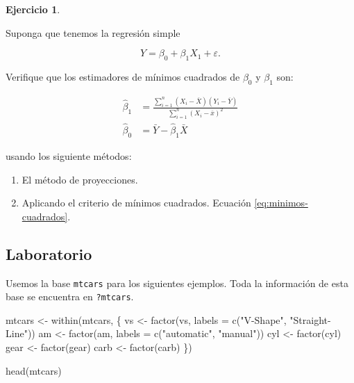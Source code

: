\documentclass[
  12pt,
]{book}
\newenvironment{Shaded}{\begin{snugshade}}{\end{snugshade}}
\newcommand{\AttributeTok}[1]{\textcolor[rgb]{0.77,0.63,0.00}{#1}}
\newcommand{\FunctionTok}[1]{\textcolor[rgb]{0.00,0.00,0.00}{#1}}
\newcommand{\NormalTok}[1]{#1}
\newcommand{\OtherTok}[1]{\textcolor[rgb]{0.56,0.35,0.01}{#1}}
\newcommand{\StringTok}[1]{\textcolor[rgb]{0.31,0.60,0.02}{#1}}
\providecommand{\tightlist}{%
  \setlength{\itemsep}{0pt}\setlength{\parskip}{0pt}}
\theoremstyle{definition}
\theoremstyle{definition}
\theoremstyle{definition}
\newtheorem{exercise}{Ejercicio}[chapter]
\theoremstyle{definition}
\theoremstyle{remark}
\begin{document}
\begin{exercise}
\protect\hypertarget{exr:unnamed-chunk-107}{}\label{exr:unnamed-chunk-107}

Suponga que tenemos la regresión simple

\begin{equation*}
Y = \beta_{0} + \beta_{1}X_{1}+\varepsilon.
\end{equation*}

Verifique que los estimadores de mínimos cuadrados de \(\beta_{0}\) y \(\beta_{1}\) son:

\begin{align*}
\hat{\beta}_{1}&= \frac{\sum_{i=1}^{n}\left(X_{i}-\overline{X}\right)\left(Y_{i}-\overline{Y}\right)}{\sum_{i=1}^{n}\left(X_{i}-\overline{x}\right)^{2}} \\ 
\hat{\beta}_{0}&= \bar{Y}-\widehat{\beta}_{1} \bar{X}
\end{align*}

usando los siguiente métodos:

\begin{enumerate}
\def\labelenumi{\arabic{enumi}.}
\tightlist
\item
  El método de proyecciones.
\item
  Aplicando el criterio de mínimos cuadrados. Ecuación \eqref{eq:minimos-cuadrados}.
\end{enumerate}

\end{exercise}

\hypertarget{laboratorio-1}{%
\subsection{Laboratorio}\label{laboratorio-1}}

Usemos la base \texttt{mtcars} para los siguientes ejemplos. Toda la información de esta base se encuentra en \texttt{?mtcars}.

\begin{Shaded}
\begin{Highlighting}[]
\NormalTok{mtcars }\OtherTok{\textless{}{-}} \FunctionTok{within}\NormalTok{(mtcars, \{}
\NormalTok{    vs }\OtherTok{\textless{}{-}} \FunctionTok{factor}\NormalTok{(vs, }\AttributeTok{labels =} \FunctionTok{c}\NormalTok{(}\StringTok{"V{-}Shape"}\NormalTok{, }\StringTok{"Straight{-}Line"}\NormalTok{))}
\NormalTok{    am }\OtherTok{\textless{}{-}} \FunctionTok{factor}\NormalTok{(am, }\AttributeTok{labels =} \FunctionTok{c}\NormalTok{(}\StringTok{"automatic"}\NormalTok{, }\StringTok{"manual"}\NormalTok{))}
\NormalTok{    cyl }\OtherTok{\textless{}{-}} \FunctionTok{factor}\NormalTok{(cyl)}
\NormalTok{    gear }\OtherTok{\textless{}{-}} \FunctionTok{factor}\NormalTok{(gear)}
\NormalTok{    carb }\OtherTok{\textless{}{-}} \FunctionTok{factor}\NormalTok{(carb)}
\NormalTok{\})}

\FunctionTok{head}\NormalTok{(mtcars)}
\end{Highlighting}
\end{Shaded}
\end{document}
